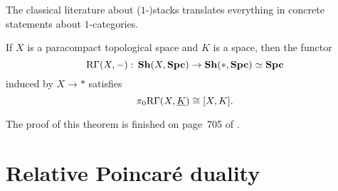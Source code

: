 \begin{rmk}
The classical literature about (\(1\)-)stacks translates everything in concrete statements about \(1\)-categories.
\end{rmk}

\begin{thm}[name={\cite[Theorem~7.1.0.1]{lurieHigherToposTheory2009}}]
If \(X\) is a paracompact topological space and \(K\) is a space, then the functor
\[ \rightderived\Gamma(X,-)\colon\catSheaf(X,\catSpace)\to\catSheaf(*,\catSpace) \simeq\catSpace \]
induced by \(X\to *\) satisfies
\[ \pi_0\mathrm{R}\Gamma(X,\underline{K}) \cong [X,K]\text{.} \]
\end{thm}
The proof of this theorem is finished on page~705 of \cite{lurieHigherToposTheory2009}.

\section{Relative Poincaré duality}


